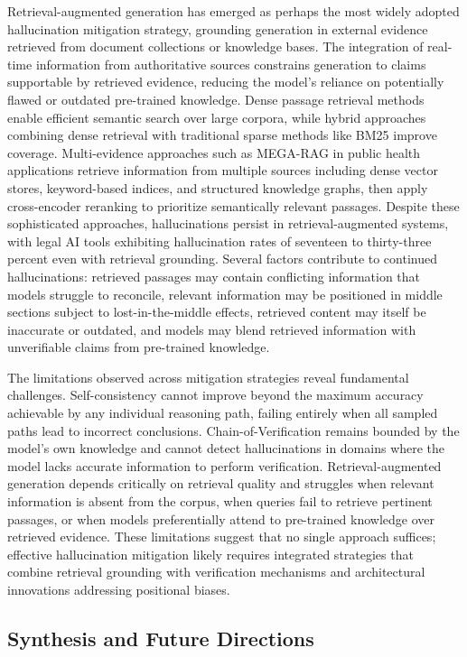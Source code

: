 \documentclass[11pt,letterpaper]{article}
\begin{document}
Retrieval-augmented generation has emerged as perhaps the most widely adopted hallucination mitigation strategy, grounding generation in external evidence retrieved from document collections or knowledge bases. The integration of real-time information from authoritative sources constrains generation to claims supportable by retrieved evidence, reducing the model's reliance on potentially flawed or outdated pre-trained knowledge. Dense passage retrieval methods enable efficient semantic search over large corpora, while hybrid approaches combining dense retrieval with traditional sparse methods like BM25 improve coverage. Multi-evidence approaches such as MEGA-RAG in public health applications retrieve information from multiple sources including dense vector stores, keyword-based indices, and structured knowledge graphs, then apply cross-encoder reranking to prioritize semantically relevant passages. Despite these sophisticated approaches, hallucinations persist in retrieval-augmented systems, with legal AI tools exhibiting hallucination rates of seventeen to thirty-three percent even with retrieval grounding. Several factors contribute to continued hallucinations: retrieved passages may contain conflicting information that models struggle to reconcile, relevant information may be positioned in middle sections subject to lost-in-the-middle effects, retrieved content may itself be inaccurate or outdated, and models may blend retrieved information with unverifiable claims from pre-trained knowledge.

The limitations observed across mitigation strategies reveal fundamental challenges. Self-consistency cannot improve beyond the maximum accuracy achievable by any individual reasoning path, failing entirely when all sampled paths lead to incorrect conclusions. Chain-of-Verification remains bounded by the model's own knowledge and cannot detect hallucinations in domains where the model lacks accurate information to perform verification. Retrieval-augmented generation depends critically on retrieval quality and struggles when relevant information is absent from the corpus, when queries fail to retrieve pertinent passages, or when models preferentially attend to pre-trained knowledge over retrieved evidence. These limitations suggest that no single approach suffices; effective hallucination mitigation likely requires integrated strategies that combine retrieval grounding with verification mechanisms and architectural innovations addressing positional biases.

\subsection{Synthesis and Future Directions}
\end{document}
